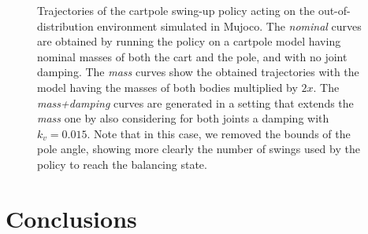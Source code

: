 \begin{figure}
    \centering
    \caption{Trajectories of the cartpole swing-up policy acting on the out-of-distribution environment simulated in Mujoco. The \emph{nominal} curves are obtained by running the policy on a cartpole model having nominal masses of both the cart and the pole, and with no joint damping. The \emph{mass} curves show the obtained trajectories with the model having the masses of both bodies multiplied by $2x$. The \emph{mass+damping} curves are generated in a setting that extends the \emph{mass} one by also considering for both joints a damping with $k_v=0.015$. Note that in this case, we removed the bounds of the pole angle, showing more clearly the number of swings used by the policy to reach the balancing state.}
    \label{fig:cartpole_mujoco_change_parameters}
\end{figure}

\section{Conclusions}

